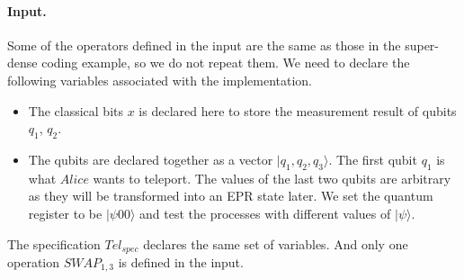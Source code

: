 \documentclass[runningheads]{llncs}
\begin{document}
\paragraph{Input.}
Some of the operators defined in the input are the same as those  in the super-dense coding example, so we do not repeat them. We need to declare the following variables associated with the implementation.
\begin{itemize}
    \item The classical bits $x$ is declared here  to store the measurement result of qubits $q_1$, $q_2$.
    \item The qubits are declared together as a vector $|q_1,q_2,q_3\rangle$. The first qubit $q_1$ is what $Alice$ wants to teleport.  The values of the last two qubits are arbitrary as they will be transformed into an EPR state later. We set the quantum register to be $|\psi00\rangle$ and test the processes with different values of $|\psi\rangle$.
\end{itemize}
The specification $Tel_{spec} $ declares the same set of variables. And only one operation $SWAP_{1,3}$ is defined in the input.
\end{document}

